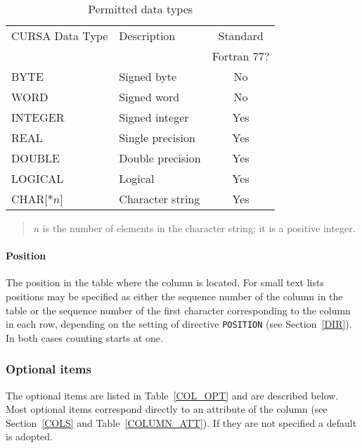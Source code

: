 \documentclass[twoside,11pt]{article}
\renewcommand{\_}{\texttt{\symbol{95}}}
\begin{document}
\begin{table}[htbp]

\begin{center}
\begin{tabular}{llc}
CURSA Data Type & Description      & Standard \\
                &                  & Fortran 77? \\ \hline
BYTE            & Signed byte      & No   \\
WORD            & Signed word      & No   \\
INTEGER         & Signed integer   & Yes  \\
REAL            & Single precision & Yes  \\
DOUBLE          & Double precision & Yes  \\
LOGICAL         & Logical          & Yes  \\
CHAR[$*n$]      & Character string & Yes  \\
\end{tabular}

\begin{quote}
$n$ is the number of elements in the character string; it is a positive
integer.
\end{quote}

\caption{Permitted data types \label{DATA_TYPES} }
\end{center}

\end{table}

\paragraph{Position}  The position in the table where the column is
located.  For small text lists positions may be specified as either the
sequence number of the column in the table or the sequence number of the
first character corresponding to the column in each row, depending
on the setting of directive {\tt POSITION} (see Section~\ref{DIR}).
In both cases counting starts at one.

\subsubsection{\label{COLOPT}Optional items}

The optional items are listed in Table~\ref{COL_OPT} and are described
below.  Most optional items correspond directly to an attribute of the
column (see Section~\ref{COLS} and Table~\ref{COLUMN_ATT}).  If they are not
specified a default is adopted.
\end{document}
